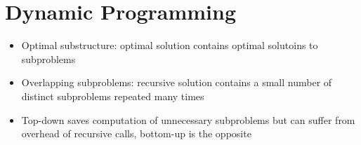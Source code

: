 \documentclass[11pt]{article}
\theoremstyle{remark}
\begin{document}
\section{Dynamic Programming}
\begin{itemize}
    \item Optimal substructure: optimal solution contains optimal solutoins to subproblems
    \item Overlapping subproblems: recursive solution contains a small number of distinct subproblems
        repeated many times
    \item Top-down saves computation of unnecessary subproblems but can suffer from
        overhead of recursive calls, bottom-up is the opposite
\end{itemize}
\end{document}
